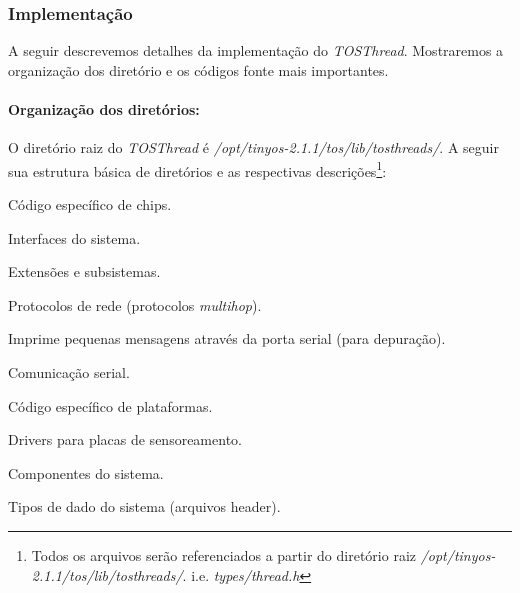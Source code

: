 \documentclass[a4paper,onecolumn, 10pt]{article}
\begin{document}
\subsubsection{Implementação}
A seguir descrevemos detalhes da implementação do \textit{TOSThread}. Mostraremos a organização dos diretório e os
códigos fonte mais importantes.

\paragraph{Organização dos diretórios:}
O diretório raiz do \textit{TOSThread} é \textit{/opt/tinyos-2.1.1/tos/lib/tosthreads/}.
A seguir sua estrutura básica de diretórios e as respectivas descrições\footnote{Todos os arquivos serão referenciados a partir do diretório
raiz \textit{/opt/tinyos-2.1.1/tos/lib/tosthreads/}. i.e. \textit{types/thread.h}}:
\begin{description}
\setlength{\itemsep}{0.2pt}
\setlength{\parskip}{0pt}
\setlength{\parsep}{0pt}
    \item[chips:] Código específico de chips.
    \item[interfaces:] Interfaces do sistema.
    \item[lib:] Extensões e subsistemas.
        \begin{description}
        \setlength{\itemsep}{0.2pt}
        \setlength{\parskip}{0pt}
        \setlength{\parsep}{0pt}
            \item[net:] Protocolos de rede (protocolos \textit{multihop}).
            \item[printf:] Imprime pequenas mensagens através da porta serial (para depuração).
            \item[serial:] Comunicação serial.
        \end{description}
    \item[platforms:] Código específico de plataformas.
    \item[sensorboards:] Drivers para placas de sensoreamento.
    \item[system:] Componentes do sistema.
    \item[types:] Tipos de dado do sistema (arquivos header).
\end{description}
\end{document}
